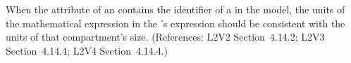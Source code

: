 When the  attribute of an \EventAssignment
contains the identifier of a \Compartment in the model, the
units of the mathematical expression in the
\EventAssignment's  expression should be
consistent with the units of that compartment's size.
(References: L2V2 Section~4.14.2; L2V3 Section~4.14.4; L2V4 Section~4.14.4.)
